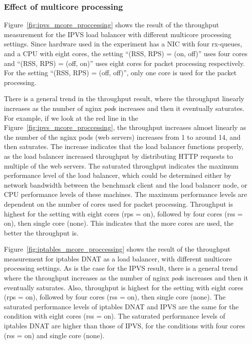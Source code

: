 \FloatBarrier

\subsubsection{Effect of multicore processing}

Figure~\ref{fig:ipvs_mcore_proccessing} shows the result of the throughput measurement for the IPVS load balancer with different multicore processing settings.
Since hardware used in the experiment has a NIC with four rx-queues, and a CPU with eight cores,
the setting \enquote{(RSS, RPS) = (on, off)} uses four cores and \enquote{(RSS, RPS) = (off, on)} uses eight cores for packet processing respectively.
For the setting \enquote{(RSS, RPS) = (off, off)}, only one core is used for the packet processing.

There is a general trend in the throughput result, where the throughput linearly increases as the number of nginx {\em pod}s increases and then it eventually saturates.
For example, if we look at the red line in the Figure~\ref{fig:ipvs_mcore_proccessing}, the throughput increases almost linearly as the number of the nginx pods (web servers) increases from 1 to around 14, and then saturates.
The increase indicates that the load balancer functions properly, as the load balancer increased throughput by distributing HTTP requests to multiple of the web servers.
%
The saturated throughput indicates the maximum performance level of the load balancer, which could be determined either by network bandwidth between the benchmark client and the load balancer node, or CPU performance levels of these machines.
%
The maximum performance levels are dependent on the number of cores used for packet processing.
Throughput is highest for the setting with eight cores (rps = on), followed by four cores (rss = on), then single core (none).
This indicates that the more cores are used, the better the throughput is.

Figure~\ref{fig:iptables_mcore_proccessing} shows the result of the throughput measurement for iptables DNAT as a load balancer, with different multicore processing settings.
As is the case for the IPVS result, there is a general trend where the throughput increases as the number of nginx {\em pod}s increases and then it eventually saturates.
Also, throughput is highest for the setting with eight cores (rps = on), followed by four cores (rss = on), then single core (none).
%
The saturated performance levels of iptables DNAT and IPVS are the same for the condition with eight cores (rss = on). 
The saturated performance levels of iptables DNAT are higher than those of IPVS, for the conditions with four cores (rss = on) and single core (none).

